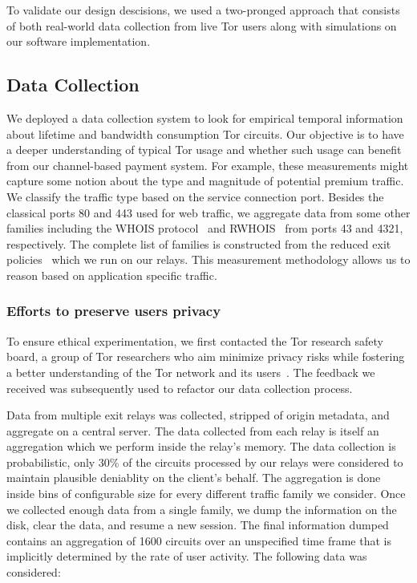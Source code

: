 To validate our design descisions, we used a two-pronged approach that consists
of both real-world data collection from live Tor users along with simulations on
our software implementation.

\subsection{Data Collection}
\label{subsec:datacollection}

We deployed a data collection system to look for empirical temporal information
about lifetime and bandwidth consumption Tor circuits. Our objective is to have
a deeper understanding of typical Tor usage and whether such usage can benefit
from our channel-based payment system. For example, these measurements might
capture some notion about the type and magnitude of potential premium
traffic. We classify the traffic type based on the service connection
port. Besides the classical ports 80 and 443 used for web traffic, we aggregate
data from some other families including the WHOIS protocol~\cite{rfc3912} and
RWHOIS~\cite{rfc2167} from ports 43 and 4321, respectively. The complete list of
families is constructed from the reduced exit
policies~\cite{reducedexitpolicies} which we run on our relays. This measurement
methodology allows us to reason based on application specific traffic.


\subsubsection{Efforts to preserve users privacy}

To ensure ethical experimentation, we first contacted the Tor research safety
board, a group of Tor researchers who aim minimize privacy risks while fostering
a better understanding of the Tor network and its users~\cite{torsafety}. The
feedback we received was subsequently used to refactor our data collection
process.

Data from multiple exit relays was collected, stripped of origin metadata, and
aggregate on a central server. The data collected from each relay is itself an
aggregation which we perform inside the relay's memory. The data collection is
probabilistic, only 30\% of the circuits processed by our relays were considered
to maintain plausible deniablity on the client's behalf. The aggregation is done
inside bins of configurable size for every different traffic family we
consider. Once we collected enough data from a single family, we dump the
information on the disk, clear the data, and resume a new session. The final
information dumped contains an aggregation of 1600 circuits over an unspecified
time frame that is implicitly determined by the rate of user activity. The
following data was considered:

